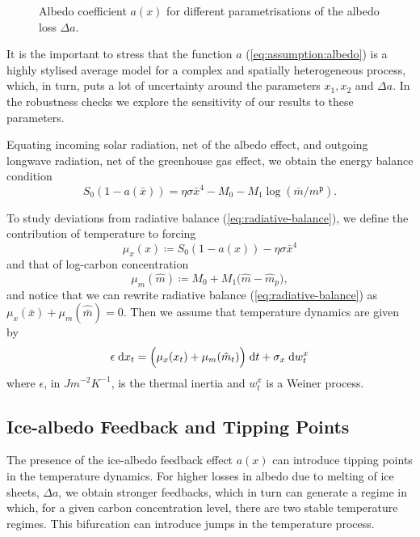\documentclass[../../main.tex]{subfiles}
\begin{document}
\begin{figure}[H]
    \centering
    \caption{Albedo coefficient $a(x)$ for different parametrisations of the albedo loss $\Delta a$.}
    \label{fig:albedo_coefficient}
\end{figure}

It is the important to stress that the function $a$ (\ref{eq:assumption:albedo}) is a highly stylised average model for a complex and spatially heterogeneous process, which, in turn, puts a lot of uncertainty around the parameters $x_1, x_2$ and $\Delta a$. In the robustness checks we explore the sensitivity of our results to these parameters.

Equating incoming solar radiation, net of the albedo effect, and outgoing longwave radiation, net of the greenhouse gas effect, we obtain the energy balance condition \begin{equation} \label{eq:radiative-balance}
    S_0 (1 - a(\bar{x})) = \eta \sigma \bar{x}^4 - M_0 - M_1 \log(\bar{m} / m^{\mathtt{p}}).
\end{equation}

To study deviations from radiative balance (\ref{eq:radiative-balance}), we define the contribution of temperature to forcing \begin{equation} \label{eq:forcing:temperature}
    \mu_x(x) \coloneqq S_0 (1 - a(x)) - \eta \sigma \bar{x}^4
\end{equation} and that of log-carbon concentration \begin{equation} \label{eq:forcing:concentration}
    \mu_m(\hat m) \coloneqq  M_0 + M_1  \big(\hat m - \hat m_p \big),
\end{equation} and notice that we can rewrite radiative balance (\ref{eq:radiative-balance}) as $\mu_x(\bar x) + \mu_m(\hat{\bar{m}}) = 0$. Then we assume that temperature dynamics are given by \begin{equation} \label{eq:dynamics:x}
    \epsilon \; \mathrm{d}x_t = \Big(\mu_x(x_t) + \mu_m(\hat m_t)\Big) \; \mathrm{d}t + \sigma_x \; \mathrm{d}w^x_t
\end{equation} where $\epsilon$, in $\unit{J} \unit{m}^{-2} \unit{K}^{-1}$, is the thermal inertia and $w^x_t$ is a Weiner process.

\subsection{Ice-albedo Feedback and Tipping Points}

The presence of the ice-albedo feedback effect $a(x)$ can introduce tipping points in the temperature dynamics. For higher losses in albedo due to melting of ice sheets, $\Delta a$, we obtain stronger feedbacks, which in turn can generate a regime in which, for a given carbon concentration level, there are two stable temperature regimes. This bifurcation can introduce jumps in the temperature process. 
\end{document}
